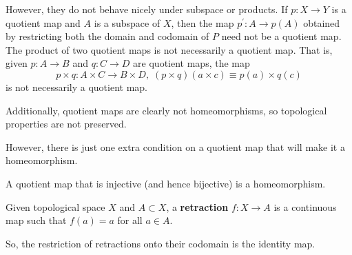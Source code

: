     However, they do not behave nicely under subspace or products. If $p: X \rightarrow Y$ is a quotient map and $A$ is a subspace of $X$, then the map $p^\prime: A \rightarrow p(A)$ obtained by restricting both the domain and codomain of $P$ need not be a quotient map. The product of two quotient maps is not necessarily a quotient map. That is, given $p: A \rightarrow B$ and $q: C \rightarrow D$ are quotient maps, the map 
    \begin{equation}
      p \times q: A \times C \rightarrow B \times D, \; (p \times q) (a \times c) \equiv p(a) \times q(c)
    \end{equation}
    is not necessarily a quotient map. 

    \begin{example}
      
    \end{example}

    \begin{example}
      
    \end{example}

    Additionally, quotient maps are clearly not homeomorphisms, so topological properties are not preserved. 

    \begin{example}[]
      
    \end{example}

    However, there is just one extra condition on a quotient map that will make it a homeomorphism.  

    \begin{lemma}
      A quotient map that is injective (and hence bijective) is a homeomorphism. 
    \end{lemma} 

    \begin{definition}[Retraction]
      Given topological space $X$ and $A \subset X$, a \textbf{retraction} $f: X \to A$ is a continuous map such that $f(a) = a$ for all $a \in A$. 
    \end{definition}

    So, the restriction of retractions onto their codomain is the identity map. 

